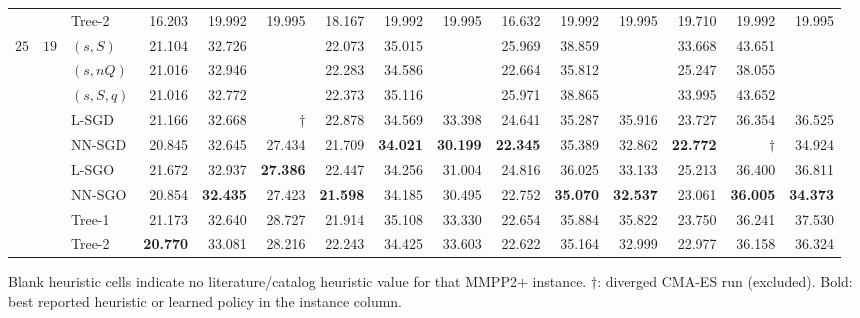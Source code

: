\begin{table}[!htbp]
{\begin{tabular}{lllrrrrrrrrrrrr}
 &  & Tree-2 & 16.203 & 19.992 & 19.995 & 18.167 & 19.992 & 19.995 & 16.632 & 19.992 & 19.995 & 19.710 & 19.992 & 19.995 \\
\addlinespace
$25$ & $19$ & $(s,S)$ & 21.104 & 32.726 &  & 22.073 & 35.015 &  & 25.969 & 38.859 &  & 33.668 & 43.651 &  \\
 &  & $(s,nQ)$ & 21.016 & 32.946 &  & 22.283 & 34.586 &  & 22.664 & 35.812 &  & 25.247 & 38.055 &  \\
 &  & $(s,S,q)$ & 21.016 & 32.772 &  & 22.373 & 35.116 &  & 25.971 & 38.865 &  & 33.995 & 43.652 &  \\
 &  & L-SGD & 21.166 & 32.668 & $\dagger$ & 22.878 & 34.569 & 33.398 & 24.641 & 35.287 & 35.916 & 23.727 & 36.354 & 36.525 \\
 &  & NN-SGD & 20.845 & 32.645 & 27.434 & 21.709 & \textbf{34.021} & \textbf{30.199} & \textbf{22.345} & 35.389 & 32.862 & \textbf{22.772} & $\dagger$ & 34.924 \\
 &  & L-SGO & 21.672 & 32.937 & \textbf{27.386} & 22.447 & 34.256 & 31.004 & 24.816 & 36.025 & 33.133 & 25.213 & 36.400 & 36.811 \\
 &  & NN-SGO & 20.854 & \textbf{32.435} & 27.423 & \textbf{21.598} & 34.185 & 30.495 & 22.752 & \textbf{35.070} & \textbf{32.537} & 23.061 & \textbf{36.005} & \textbf{34.373} \\
 &  & Tree-1 & 21.173 & 32.640 & 28.727 & 21.914 & 35.108 & 33.330 & 22.654 & 35.884 & 35.822 & 23.750 & 36.241 & 37.530 \\
 &  & Tree-2 & \textbf{20.770} & 33.081 & 28.216 & 22.243 & 34.425 & 33.603 & 22.622 & 35.164 & 32.999 & 22.977 & 36.158 & 36.324 \\
\bottomrule
\end{tabular}}
\par\medskip\footnotesize Blank heuristic cells indicate no literature/catalog heuristic value for that MMPP2$+$ instance. $\dagger$: diverged CMA-ES run (excluded). Bold: best reported heuristic or learned policy in the instance column.
\end{table}
\FloatBarrier

